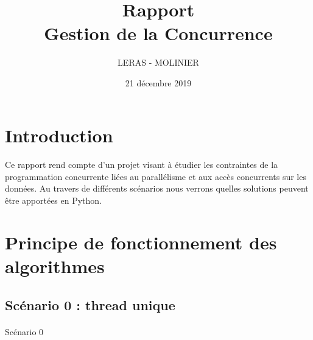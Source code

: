 \documentclass[12pt,oneside,a4paper]{article}
\makeatletter
\def\BState{\State\hskip-\ALG@thistlm}
\makeatother
\begin{document}
\title{%
  Rapport \\Gestion de la Concurrence}

\author{LERAS - MOLINIER}
\date{21 décembre 2019}
\maketitle
\paragraph{}
\paragraph{}
\section{Introduction}
\paragraph{}
Ce rapport rend compte d'un projet visant à étudier les contraintes de la programmation concurrente liées au parallélisme et 
aux accès concurrents sur les données. Au travers de différents scénarios nous verrons quelles solutions
peuvent être apportées en Python.

\section{Principe de fonctionnement des algorithmes}

\subsection{Scénario 0 : thread unique}
\paragraph{}

\begin{algorithm}[H]
  \caption{Scénario 0}\label{euclid}
\end{algorithm}
\end{document}
